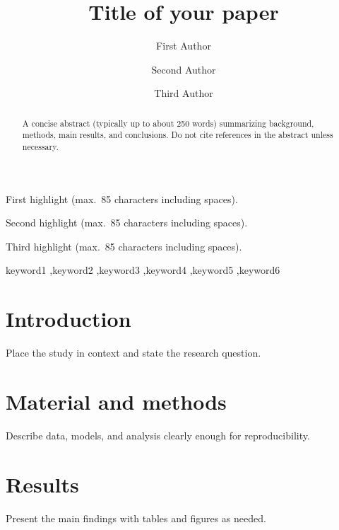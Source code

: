 \documentclass[preprint,12pt,number]{elsarticle}
\begin{document}
\linenumbers

\begin{frontmatter}

\title{Title of your paper}

\author[inst1]{First Author}
\author[inst1]{Second Author}
\author[inst2]{Third Author}




\begin{abstract}
A concise abstract (typically up to about 250 words) summarizing background, methods, main results, and conclusions. Do not cite references in the abstract unless necessary.
\end{abstract}

\begin{highlights}
\item First highlight (max.\ 85 characters including spaces).
\item Second highlight (max.\ 85 characters including spaces).
\item Third highlight (max.\ 85 characters including spaces).
\end{highlights}

\begin{keyword}
keyword1 \sep keyword2 \sep keyword3 \sep keyword4 \sep keyword5 \sep keyword6
\end{keyword}

\end{frontmatter}

\section{Introduction}
Place the study in context and state the research question.

\section{Material and methods}
Describe data, models, and analysis clearly enough for reproducibility.

\section{Results}
Present the main findings with tables and figures as needed.
\end{document}
